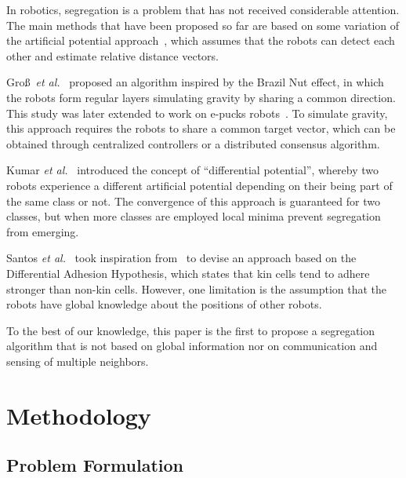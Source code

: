 \documentclass[letterpaper, 10 pt, conference]{ieeeconf}
\begin{document}
In robotics, segregation is a problem that has not received considerable
attention. The main methods that have been proposed so far are based on some
variation of the artificial potential approach~\cite{Spears2004}, which assumes
that the robots can detect each other and estimate relative distance vectors.

Gro\ss~\emph{et al.}~\cite{gross_segregation_2009} proposed an
algorithm inspired by the Brazil Nut effect, in which the robots form regular
layers simulating gravity by sharing a common direction. This study was later
extended to work on e-pucks robots~\cite{Chen2012}. To simulate gravity, this
approach requires the robots to share a common target vector, which can be
obtained through centralized controllers or a distributed consensus algorithm.

Kumar \emph{et al.}~\cite{kumar_segregation_2010} introduced the concept of
``differential potential'', whereby two robots experience a different artificial
potential depending on their being part of the same class or not. The
convergence of this approach is guaranteed for two classes, but when more
classes are employed local minima prevent segregation from emerging.

Santos \emph{et al.}~\cite{santos_segregation_2014} took inspiration
from~\cite{kumar_segregation_2010} to devise an approach based on the
Differential Adhesion Hypothesis, which states that kin cells tend to adhere
stronger than non-kin cells. However, one limitation is the assumption
that the robots have global knowledge about the positions of other robots.

To the best of our knowledge, this paper is the first to propose a segregation
algorithm that is not based on global information nor on communication and
sensing of multiple neighbors.

\section{Methodology}

\subsection{Problem Formulation}
\end{document}
